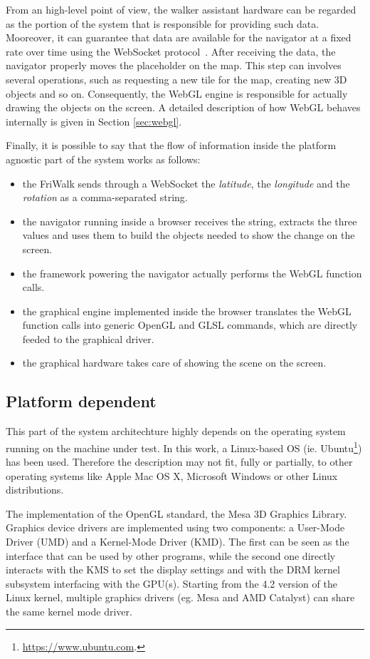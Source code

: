 From an high-level point of view, the walker assistant hardware can be regarded
as the portion of the system that is responsible for providing such data. Mooreover,
it can guarantee that data are available for the navigator at a fixed rate over
time using the WebSocket protocol~\cite{fette2011websocket}.
After receiving the data, the navigator properly moves the placeholder on the map.
This step can involves several operations, such as requesting a new tile for the
map, creating new 3D objects and so on. Consequently, the WebGL engine is responsible
for actually drawing the objects on the screen. A detailed description of how WebGL
behaves internally is given in Section \ref{sec:webgl}.

Finally, it is possible to say that the flow of information inside the platform
agnostic part of the system works as follows:
\begin{itemize}
    \item the FriWalk sends through a WebSocket the \emph{latitude}, the
        \emph{longitude} and the \emph{rotation} as a comma-separated string.
    \item the navigator running inside a browser receives the string, extracts
        the three values and uses them to build the objects needed to show the
        change on the screen.
    \item the framework powering the navigator actually performs the
        WebGL function calls.
    \item the graphical engine implemented inside the browser translates the WebGL
        function calls into generic OpenGL and GLSL commands, which are directly
        feeded to the graphical driver.
    \item the graphical hardware takes care of showing the scene on the screen.
\end{itemize}


\subsection{Platform dependent} \label{sec:platform_dependent}
This part of the system architechture highly depends on the operating system
running on the machine under test. In this work, a Linux-based OS (ie.
Ubuntu\footnote{\url{https://www.ubuntu.com}.})
has been used. Therefore the description may not fit, fully or partially, to
other operating systems like Apple Mac OS X, Microsoft Windows or other Linux
distributions.

The implementation of the OpenGL standard, the Mesa 3D Graphics Library. 
Graphics device drivers are implemented using two components: a User-Mode Driver
(UMD) and a Kernel-Mode Driver (KMD). The first can be seen as the interface
that can be used by other programs, while the second one directly interacts
with the KMS to set the display settings and with the DRM kernel subsystem
interfacing with the GPU(s). Starting from the 4.2 version of the Linux kernel,
multiple graphics drivers (eg. Mesa and AMD Catalyst) can share the same kernel
mode driver.


